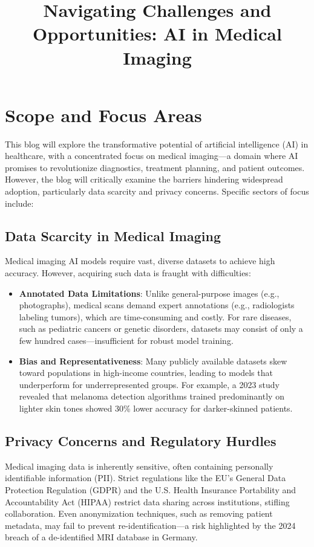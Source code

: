 \documentclass{article}
\title{Navigating Challenges and Opportunities: AI in Medical Imaging}
\begin{document}
%
\maketitle
\section{Scope and Focus Areas}
This blog will explore the transformative potential of artificial intelligence (AI) in healthcare, with a concentrated focus on medical imaging—a domain where AI promises to revolutionize diagnostics, treatment planning, and patient outcomes. However, the blog will critically examine the barriers hindering widespread adoption, particularly data scarcity and privacy concerns. Specific sectors of focus include:

\subsection{Data Scarcity in Medical Imaging}
Medical imaging AI models require vast, diverse datasets to achieve high accuracy. However, acquiring such data is fraught with difficulties:
\begin{itemize}
    \item \textbf{Annotated Data Limitations}: Unlike general-purpose images (e.g., photographs), medical scans demand expert annotations (e.g., radiologists labeling tumors), which are time-consuming and costly. For rare diseases, such as pediatric cancers or genetic disorders, datasets may consist of only a few hundred cases—insufficient for robust model training.
    \item \textbf{Bias and Representativeness}: Many publicly available datasets skew toward populations in high-income countries, leading to models that underperform for underrepresented groups. For example, a 2023 study revealed that melanoma detection algorithms trained predominantly on lighter skin tones showed 30\% lower accuracy for darker-skinned patients.
\end{itemize}

\subsection{Privacy Concerns and Regulatory Hurdles}
Medical imaging data is inherently sensitive, often containing personally identifiable information (PII). Strict regulations like the EU’s General Data Protection Regulation (GDPR) and the U.S. Health Insurance Portability and Accountability Act (HIPAA) restrict data sharing across institutions, stifling collaboration. Even anonymization techniques, such as removing patient metadata, may fail to prevent re-identification—a risk highlighted by the 2024 breach of a de-identified MRI database in Germany.
\end{document}
